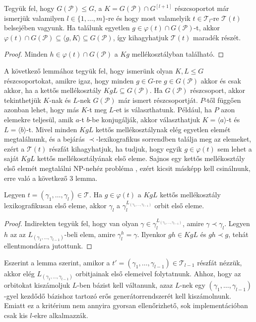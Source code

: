 \begin{lemma}
\label{thm:permbtcrit1}
Tegyük fel, hogy $G(\mathcal{P}) \le G$, a $K = G(\mathcal{P}) \cap G^{[l+1]}$ részcsoportot már ismerjük valamilyen $l \in \{1,\dots,m\}$-re és hogy most valamelyik $t \in \mathcal{T}_l$-re $\mathcal{T}(t)$ belsejében vagyunk.
Ha találunk egyetlen $g \in \varphi(t) \cap G(\mathcal{P})$-t, akkor $\varphi(t) \cap G(\mathcal{P}) \subseteq \langle g, K \rangle \subseteq G(\mathcal{P})$, így kihagyhatjuk $\mathcal{T}(t)$ maradék részét.
\end{lemma}
\begin{proof}
Minden $h \in \varphi(t) \cap G(\mathcal{P})$ a $Kg$ mellékosztályban található.
\end{proof}
A következő lemmához tegyük fel, hogy ismerünk olyan $K, L \le G$ részcsoportokat, amikre igaz, hogy minden $g \in G$-re $g \in G(\mathcal{P})$ akkor és csak akkor, ha a kettős mellékosztály $KgL \subseteq G(\mathcal{P})$.
Ha $G(\mathcal{P})$ részcsoport, akkor tekinthetjük $K$-nak és $L$-nek $G(\mathcal{P})$ már ismert részcsoportját.
$P$-től függően azonban lehet, hogy más $K$-t meg $L$-et is választhatunk.
Például, ha $P$ azon elemekre teljesül, amik $a$-t $b$-be konjugálják, akkor választhatjuk $K=\langle a \rangle$-t és $L=\langle b \rangle$-t.
Mivel minden $KgL$ kettős mellékosztálynak elég egyetlen elemét megtalálnunk, és a bejárás $\prec$-lexikografikus sorrendben találja meg az elemeket, ezért a $\mathcal{T}(t)$ részfát kihagyhatjuk, ha tudjuk, hogy
egyik $g \in \varphi(t)$ sem lehet a saját $KgL$ kettős mellékosztályának első eleme.
Sajnos egy kettős mellékosztály első elemét megtalálni NP-nehéz probléma \cite{Luk93}, ezért kicsit másképp kell csinálnunk, erre való a következő 3 lemma.

\begin{lemma}
\label{thm:permbtcrit2}
Legyen $t = (\gamma_1, \dots, \gamma_l) \in \mathcal{T}$.
Ha $g \in \varphi(t)$ a $KgL$ kettős mellékosztály lexikografikusan első eleme, akkor $\gamma_l$ a $\gamma_l^{L_{(\gamma_1,\dots,\gamma_{l-1})}}$ orbit első eleme.
\end{lemma}
\begin{proof}
Indirekten tegyük fel, hogy van olyan $\gamma \in \gamma_l^{L_{(\gamma_1,\dots,\gamma_{l-1})}}$, amire $\gamma \prec \gamma_l$.
Legyen $h$ az az $L_{(\gamma_1,\dots,\gamma_{l-1})}$-beli elem, amire $\gamma_l^h = \gamma$.
Ilyenkor $gh \in KgL$ és $gh \prec g$, tehát ellentmondásra jutottunk.
\end{proof}
Eszerint a lemma szerint, amikor a $t' = (\gamma_1, \dots, \gamma_{l-1}) \in \mathcal{T}_{l-1}$ részfát nézzük, akkor elég $L_{(\gamma_1,\dots,\gamma_{l-1})}$ orbitjainak első elemeivel folytatnunk.
Ahhoz, hogy az orbitokat kiszámoljuk $L$-ben bázist kell váltanunk, azaz $L$-nek egy $(\gamma_1,\dots,\gamma_{l-1})$-gyel kezdődő bázishoz tartozó erős generátorrendszerét kell kiszámolnunk.
Emiatt ez a kritérium nem annyira gyorsan ellenőrizhető, sok implementációban csak kis $l$-ekre alkalmazzák.


